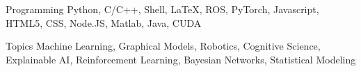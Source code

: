 


\begin{cvskills}


\cvskill
{Programming} %
{Python, C/C++, Shell, LaTeX, ROS, PyTorch, Javascript, HTML5, CSS, Node.JS, Matlab, Java, CUDA} %


\cvskill
{Topics} %
{Machine Learning, Graphical Models, Robotics, Cognitive Science, Explainable AI, Reinforcement Learning, Bayesian Networks, Statistical Modeling} %



\end{cvskills}